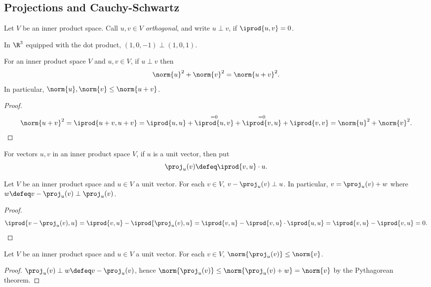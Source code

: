 \subsection{Projections and Cauchy-Schwartz}

\begin{definition}[Orthogonal]
    Let $V$ be an inner product space. Call $u, v \in V$ \emph{orthogonal}, and write $u \perp v$, if $\iprod{u,v} = 0$.
\end{definition}
\begin{example}
    In $\R^3$ equipped with the dot product, $(1, 0, -1) \perp (1, 0, 1)$.
\end{example}

\begin{theorem}
    For an inner product space $V$ and $u, v \in V$, if $u \perp v$ then \[
    \norm{u}^2 + \norm{v}^2 = \norm{u + v}^2.    
    \]
    In particular, $\norm{u}, \norm{v} \leq \norm{u + v}$.
\end{theorem}
\begin{proof}
    \[
    \norm{u + v}^2 = \iprod{u + v, u + v} = \iprod{u, u} + \overset{=0}{\iprod{u, v}} + \overset{=0}{\iprod{v, u}} + \iprod{v, v} = \norm{u}^2 + \norm{v}^2.
    \]
\end{proof}

\begin{definition}
    For vectors $u, v$ in an inner product space $V$, if $u$ is a unit vector, then put \[
    \proj_u(v) \defeq \iprod{v, u}\cdot u.     
    \]
\end{definition}

\begin{proposition}
    Let $V$ be an inner product space and $u \in V$ a unit vector. For each $v \in V$, $v - \proj_u(v) \perp u$. In particular, $v = \proj_u(v) + w$ where $w \defeq v - \proj_u(v) \perp \proj_u(v)$.
\end{proposition}

\begin{proof}
    \[
    \iprod{v - \proj_u(v), u} = \iprod{v, u} - \iprod{\proj_u(v), u} = \iprod{v, u} - \iprod{v, u} \cdot \iprod{u, u}     = \iprod{v, u} - \iprod{v, u} = 0.
    \]
\end{proof}
\begin{corollary}
    Let $V$ be an inner product space and $u \in V$ a unit vector. For each $v \in V$, $\norm{\proj_u(v)} \leq \norm{v}$.
\end{corollary}

\begin{proof}
    $\proj_u(v) \perp w \defeq v - \proj_u(v)$, hence $\norm{\proj_u(v)} \leq \norm{\proj_u(v) + w} = \norm{v}$ by the Pythagorean theorem.
\end{proof}

